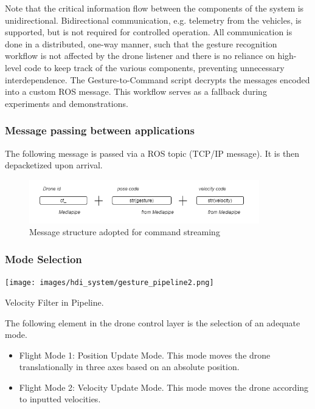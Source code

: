 Note that the critical information flow between the components of the system is unidirectional. Bidirectional communication, e.g. telemetry from the vehicles, is supported, but is not required for controlled operation. All communication is done in a distributed, one-way manner, such that the gesture recognition workflow is not affected by the drone listener and there is no reliance on high-level code to keep track of the various components, preventing unnecessary interdependence. The Gesture-to-Command script decrypts the messages encoded into a custom ROS message. This workflow serves as a fallback during experiments and demonstrations.

\subsubsection{Message passing between applications}


The following message is passed via a ROS topic (TCP/IP message). It is then depacketized upon arrival.

\begin{figure}[h]
    \raggedright
    \includegraphics[width=10cm]{images/hdi_system/msg_structure.png}
    \caption{Message structure adopted for command streaming}
\end{figure}

\subsubsection{Mode Selection}

\begin{marginfigure}%
  \texttt{[image: images/hdi\_system/gesture\_pipeline2.png]}
  \caption{Velocity Filter in Pipeline.}
  \label{fig:gestures_mode}
\end{marginfigure}

The following element in the drone control layer is the selection of an adequate mode.
\begin{itemize}
    \item Flight Mode 1: Position Update Mode. This mode moves the drone translationally in three axes based on an absolute position. 
    \item Flight Mode 2: Velocity Update Mode. This mode moves the drone according to inputted velocities.
\end{itemize}

